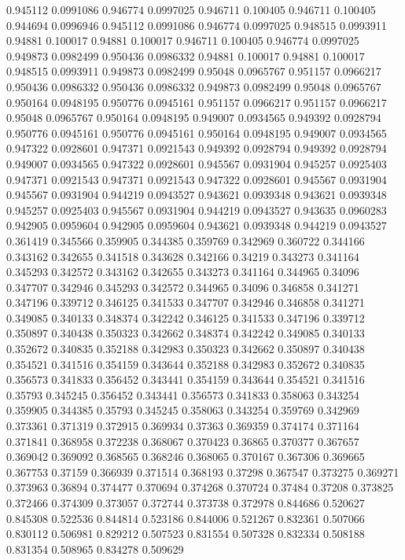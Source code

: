 0.945112 0.0991086
0.946774 0.0997025
0.946711 0.100405
0.946711 0.100405
0.944694 0.0996946
0.945112 0.0991086
0.946774 0.0997025
0.948515 0.0993911
0.94881 0.100017
0.94881 0.100017
0.946711 0.100405
0.946774 0.0997025
0.949873 0.0982499
0.950436 0.0986332
0.94881 0.100017
0.94881 0.100017
0.948515 0.0993911
0.949873 0.0982499
0.95048 0.0965767
0.951157 0.0966217
0.950436 0.0986332
0.950436 0.0986332
0.949873 0.0982499
0.95048 0.0965767
0.950164 0.0948195
0.950776 0.0945161
0.951157 0.0966217
0.951157 0.0966217
0.95048 0.0965767
0.950164 0.0948195
0.949007 0.0934565
0.949392 0.0928794
0.950776 0.0945161
0.950776 0.0945161
0.950164 0.0948195
0.949007 0.0934565
0.947322 0.0928601
0.947371 0.0921543
0.949392 0.0928794
0.949392 0.0928794
0.949007 0.0934565
0.947322 0.0928601
0.945567 0.0931904
0.945257 0.0925403
0.947371 0.0921543
0.947371 0.0921543
0.947322 0.0928601
0.945567 0.0931904
0.945567 0.0931904
0.944219 0.0943527
0.943621 0.0939348
0.943621 0.0939348
0.945257 0.0925403
0.945567 0.0931904
0.944219 0.0943527
0.943635 0.0960283
0.942905 0.0959604
0.942905 0.0959604
0.943621 0.0939348
0.944219 0.0943527
0.361419 0.345566
0.359905 0.344385
0.359769 0.342969
0.360722 0.344166
0.343162 0.342655
0.341518 0.343628
0.342166 0.34219
0.343273 0.341164
0.345293 0.342572
0.343162 0.342655
0.343273 0.341164
0.344965 0.34096
0.347707 0.342946
0.345293 0.342572
0.344965 0.34096
0.346858 0.341271
0.347196 0.339712
0.346125 0.341533
0.347707 0.342946
0.346858 0.341271
0.349085 0.340133
0.348374 0.342242
0.346125 0.341533
0.347196 0.339712
0.350897 0.340438
0.350323 0.342662
0.348374 0.342242
0.349085 0.340133
0.352672 0.340835
0.352188 0.342983
0.350323 0.342662
0.350897 0.340438
0.354521 0.341516
0.354159 0.343644
0.352188 0.342983
0.352672 0.340835
0.356573 0.341833
0.356452 0.343441
0.354159 0.343644
0.354521 0.341516
0.35793 0.345245
0.356452 0.343441
0.356573 0.341833
0.358063 0.343254
0.359905 0.344385
0.35793 0.345245
0.358063 0.343254
0.359769 0.342969
0.373361 0.371319
0.372915 0.369934
0.37363 0.369359
0.374174 0.371164
0.371841 0.368958
0.372238 0.368067
0.370423 0.36865
0.370377 0.367657
0.369042 0.369092
0.368565 0.368246
0.368065 0.370167
0.367306 0.369665
0.367753 0.37159
0.366939 0.371514
0.368193 0.37298
0.367547 0.373275
0.369271 0.373963
0.36894 0.374477
0.370694 0.374268
0.370724 0.37484
0.37208 0.373825
0.372466 0.374309
0.373057 0.372744
0.373738 0.372978
0.844686 0.520627
0.845308 0.522536
0.844814 0.523186
0.844006 0.521267
0.832361 0.507066
0.830112 0.506981
0.829212 0.507523
0.831554 0.507328
0.832334 0.508188
0.831354 0.508965
0.834278 0.509629
